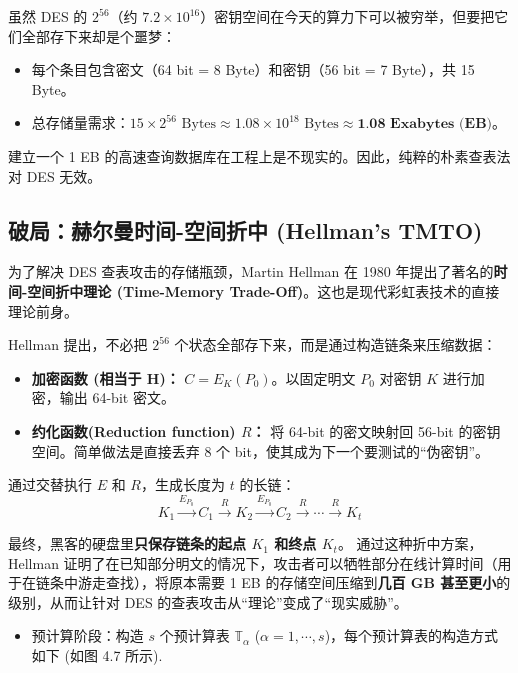 \documentclass[12pt,a4paper]{article}
\begin{document}
\begin{warningbox}
虽然 DES 的 $2^{56}$（约 $7.2 \times 10^{16}$）密钥空间在今天的算力下可以被穷举，但要把它们全部存下来却是个噩梦：
\begin{itemize}
    \item 每个条目包含密文（64 bit = 8 Byte）和密钥（56 bit = 7 Byte），共 15 Byte。
    \item 总存储量需求：$15 \times 2^{56} \text{ Bytes} \approx 1.08 \times 10^{18} \text{ Bytes} \approx \textbf{1.08 Exabytes (EB)}$。
\end{itemize}
建立一个 1 EB 的高速查询数据库在工程上是不现实的。因此，纯粹的朴素查表法对 DES 无效。
\end{warningbox}

\subsection{破局：赫尔曼时间-空间折中 (Hellman's TMTO)}
为了解决 DES 查表攻击的存储瓶颈，Martin Hellman 在 1980 年提出了著名的\textbf{时间-空间折中理论 (Time-Memory Trade-Off)}。这也是现代彩虹表技术的直接理论前身。

Hellman 提出，不必把 $2^{56}$ 个状态全部存下来，而是通过构造链条来压缩数据：
\begin{coreconcept}
\begin{itemize}
    \item \textbf{加密函数 (相当于 H)：} $C = E_K(P_0)$。以固定明文 $P_0$ 对密钥 $K$ 进行加密，输出 64-bit 密文。
    \item \textbf{约化函数(Reduction function) $R$：} 将 64-bit 的密文映射回 56-bit 的密钥空间。简单做法是直接丢弃 8 个 bit，使其成为下一个要测试的“伪密钥”。
\end{itemize}
通过交替执行 $E$ 和 $R$，生成长度为 $t$ 的长链：
$$ K_1 \xrightarrow{E_{P_0}} C_1 \xrightarrow{R} K_2 \xrightarrow{E_{P_0}} C_2 \xrightarrow{R} \cdots \xrightarrow{R} K_t $$
\end{coreconcept}

最终，黑客的硬盘里\textbf{只保存链条的起点 $K_1$ 和终点 $K_t$}。
通过这种折中方案，Hellman 证明了在已知部分明文的情况下，攻击者可以牺牲部分在线计算时间（用于在链条中游走查找），将原本需要 1 EB 的存储空间压缩到\textbf{几百 GB 甚至更小}的级别，从而让针对 DES 的查表攻击从“理论”变成了“现实威胁”。
\begin{itemize}
    \item 预计算阶段：构造 $s$ 个预计算表 $\mathbb{T}_\alpha$ ($\alpha = 1, \cdots, s$)，每个预计算表的构造方式如下 (如图 4.7 所示).
\end{itemize}
\end{document}
